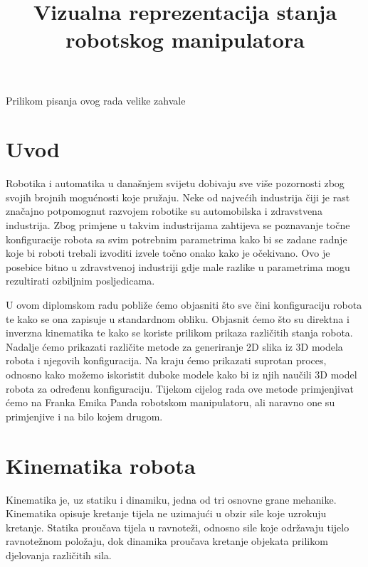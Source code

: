\documentclass[times, utf8, diplomskirad]{fer}
\title{Vizualna reprezentacija stanja robotskog manipulatora}
\begin{document}

\begin{zahvale}
    Prilikom pisanja ovog rada velike zahvale
\end{zahvale}


\mainmatter
{}


\tableofcontents

\setcounter{page}{1}
\mainmatter

\chapter{Uvod}
\label{pog:uvod}
\hspace{\parindent}Robotika i automatika u današnjem svijetu dobivaju sve više pozornosti zbog svojih brojnih mogućnosti koje pružaju.
Neke od najvećih industrija čiji je rast značajno potpomognut razvojem robotike su automobilska i zdravstvena industrija.
Zbog primjene u takvim industrijama zahtijeva se poznavanje točne konfiguracije robota sa svim potrebnim parametrima kako
bi se zadane radnje koje bi roboti trebali izvoditi izvele točno onako kako je očekivano.
Ovo je posebice bitno u zdravstvenoj industriji gdje male razlike u parametrima mogu rezultirati ozbiljnim posljedicama.

U ovom diplomskom radu pobliže ćemo objasniti što sve čini konfiguraciju robota te kako se ona zapisuje u standardnom obliku.
Objasnit ćemo što su direktna i inverzna kinematika te kako se koriste prilikom prikaza različitih stanja robota.
Nadalje ćemo prikazati različite metode za generiranje 2D slika iz 3D modela robota i njegovih konfiguracija.
Na kraju ćemo prikazati suprotan proces, odnosno kako možemo iskoristit duboke modele kako bi iz njih naučili 3D model robota za određenu konfiguraciju.
Tijekom cijelog rada ove metode primjenjivat ćemo na Franka Emika Panda robotskom manipulatoru, ali naravno one su primjenjive i na bilo kojem drugom.

\chapter{Kinematika robota}
Kinematika je, uz statiku i dinamiku, jedna od tri osnovne grane mehanike.
Kinematika opisuje kretanje tijela ne uzimajući u obzir sile koje uzrokuju kretanje.
Statika proučava tijela u ravnoteži, odnosno sile koje održavaju tijelo ravnotežnom položaju, dok dinamika proučava kretanje objekata prilikom djelovanja različitih sila.
\end{document}
